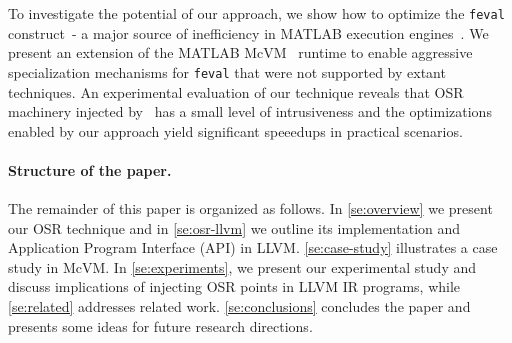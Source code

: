 
\noindent To investigate the potential of our approach, we show how to optimize the {\tt feval} construct\ - a major source of inefficiency in MATLAB execution engines~\cite{lameed2013feval, radpour2013refactoring}. We present an extension of the MATLAB McVM~\cite{chevalier2010mcvm} runtime to enable aggressive specialization mechanisms for {\tt feval} that were not supported by extant techniques\cite{lameed2013feval}. An experimental evaluation of our technique reveals that OSR machinery injected by \osrkit\ has a small level of intrusiveness and the optimizations enabled by our approach yield significant speeedups in practical scenarios.



\paragraph{Structure of the paper.}
The remainder of this paper is organized as follows. In \mysection\ref{se:overview} we present our OSR technique and in \mysection\ref{se:osr-llvm} we outline its implementation and Application Program Interface (API) in LLVM. \mysection\ref{se:case-study} illustrates a case study in McVM. In \mysection\ref{se:experiments}, we present our experimental study and discuss implications of injecting OSR points in LLVM IR programs, while \mysection\ref{se:related} addresses related work. \mysection\ref{se:conclusions} concludes the paper and presents some ideas for future research directions.
